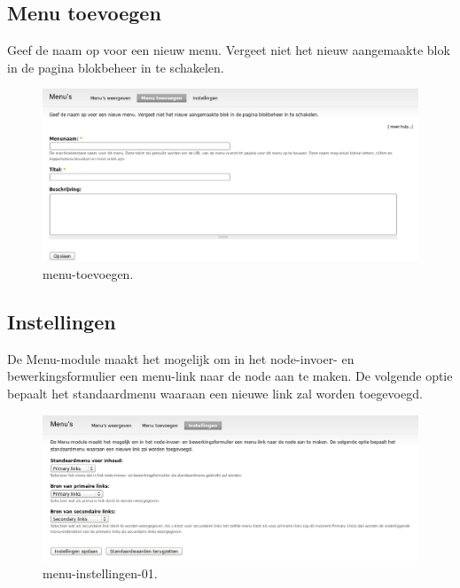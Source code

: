 \subsection{Menu toevoegen}
Geef de naam op voor een nieuw menu. Vergeet niet het nieuw aangemaakte blok in
de pagina blokbeheer in te schakelen.
\begin{figure}[!h]
    \centering
   \includegraphics[scale=0.3,angle=0]{menu-toevoegen}
   \caption{menu-toevoegen.\label{white}}
 \end{figure}

\subsection{Instellingen}
De Menu-module maakt het mogelijk om in het node-invoer- en bewerkingsformulier
een menu-link naar de node aan te maken. De volgende optie bepaalt het standaardmenu waaraan een nieuwe link zal worden toegevoegd. 
\begin{figure}[!h]
    \centering
   \includegraphics[scale=0.3,angle=0]{menu-instellingen-01}
   \caption{menu-instellingen-01.\label{white}}
 \end{figure}

